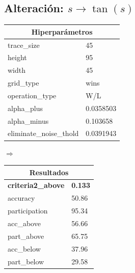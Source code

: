 \documentclass[11pt]{article}
\begin{document}
\subsection{Alteración: $s \to \tan(s)$}
\begin{table}[H]
    \centering
    \begin{tabular}{|ll|}
        \hline
        \multicolumn{2}{|c|}{Hiperparámetros} \\
        \hline
        trace\_size            &         45 \\
        height                &         95 \\
        width                 &         45 \\
        grid\_type             &       wins \\
        operation\_type        &        W/L \\
        alpha\_plus            &  0.0358503 \\
        alpha\_minus           &   0.103658 \\
        eliminate\_noise\_thold &  0.0391943 \\
        \hline
        \end{tabular}
    $\Rightarrow$
    \begin{tabular}{|ll|}
        \hline
        \multicolumn{2}{|c|}{Resultados}\\
        \hline
        \textbf{criteria2\_above} & \textbf{0.133} \\
        accuracy            &          50.86 \\
        participation                &         95.34 \\
        acc\_above                 &          56.66 \\
        part\_above             &       65.75 \\
        acc\_below        &        37.96 \\
        part\_below            &    29.58 \\
        \hline
    \end{tabular}
\end{table}
\dotfill
\end{document}
